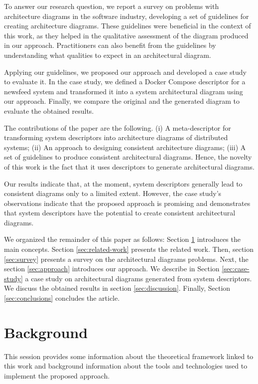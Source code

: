\documentclass[sigconf]{acmart}
\begin{document}
To answer our research question, we report a survey on problems with architecture diagrams in the software industry, developing a set of guidelines for creating architecture diagrams. These guidelines were beneficial in the context of this work, as they helped in the qualitative assessment of the diagram produced in our approach. Practitioners can also benefit from the guidelines by understanding what qualities to expect in an architectural diagram.

Applying our guidelines, we proposed our approach and developed a case study to evaluate it. In the case study, we defined a Docker Compose descriptor for a newsfeed system and transformed it into a system architectural diagram using our approach. Finally, we compare the original and the generated diagram to evaluate the obtained results.

The contributions of the paper are the following. (i) A meta-descriptor for transforming system descriptors into architecture diagrams of distributed systems; (ii) An approach to designing consistent architecture diagrams;  (iii) A set of guidelines to produce consistent architectural diagrams. Hence, the novelty of this work is the fact that it uses descriptors to generate architectural diagrams.

Our results indicate that, at the moment, system descriptors generally lead to consistent diagrams only to a limited extent. However, the case study's observations indicate that the proposed approach is promising and demonstrates that system descriptors have the potential to create consistent architectural diagrams.

We organized the remainder of this paper as follows: Section \ref{sec:Background-motivation} introduces the main concepts. Section \ref{sec:related-work} presents the related work. Then, section \ref{sec:survey} presents a survey on the architectural diagrams problems. Next, the section \ref{sec:approach} introduces our approach. We describe in Section \ref{sec:case-study} a case study on architectural diagrams generated from system descriptors. We discuss the obtained results in section \ref{sec:discussion}. Finally, Section \ref{sec:conclusions} concludes the article.



\section{Background}
\label{sec:Background-motivation}
This session provides some information about the theoretical framework linked to this work and background information about the tools and technologies used to implement the proposed approach.
\end{document}
